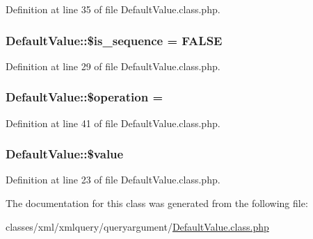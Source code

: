 Definition at line 35 of file Default\+Value.\+class.\+php.

\hypertarget{classDefaultValue_a7ad2c3e04c79053b6299c0fa0e35389e}{}
\subsubsection[{\$is\+\_\+sequence}]{\setlength{\rightskip}{0pt plus 5cm}Default\+Value\+::\$is\+\_\+sequence = F\+A\+L\+S\+E}\label{classDefaultValue_a7ad2c3e04c79053b6299c0fa0e35389e}


Definition at line 29 of file Default\+Value.\+class.\+php.

\hypertarget{classDefaultValue_a0b0e52103637bbb5ea0fdedcb0672fcd}{}
\subsubsection[{\$operation}]{\setlength{\rightskip}{0pt plus 5cm}Default\+Value\+::\$operation = \textquotesingle{}\textquotesingle{}}\label{classDefaultValue_a0b0e52103637bbb5ea0fdedcb0672fcd}


Definition at line 41 of file Default\+Value.\+class.\+php.

\hypertarget{classDefaultValue_a963ea764e6dfb5dbfe87c4b8ffd131ac}{}
\subsubsection[{\$value}]{\setlength{\rightskip}{0pt plus 5cm}Default\+Value\+::\$value}\label{classDefaultValue_a963ea764e6dfb5dbfe87c4b8ffd131ac}


Definition at line 23 of file Default\+Value.\+class.\+php.



The documentation for this class was generated from the following file\+:\begin{DoxyCompactItemize}
\item 
classes/xml/xmlquery/queryargument/\hyperlink{DefaultValue_8class_8php}{Default\+Value.\+class.\+php}\end{DoxyCompactItemize}
